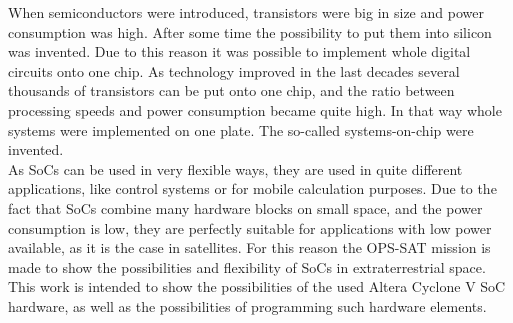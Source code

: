 When semiconductors were introduced, transistors were big in size and power consumption was high. After some time the possibility to put them into silicon was invented. Due to this reason it was possible to implement whole digital circuits onto one chip. As technology improved in the last decades several thousands of transistors can be put onto one chip, and the ratio between processing speeds and power consumption became quite high. In that way whole systems were implemented on one plate. The so-called systems-on-chip were invented.\\
As SoCs can be used in very flexible ways, they are used in quite different applications, like control systems or for mobile calculation purposes. Due to the fact that SoCs combine many hardware blocks on small space, and the power consumption is low, they are perfectly suitable for applications with low power available, as it is the case in satellites. For this reason the OPS-SAT mission is made to show the possibilities and flexibility of SoCs in extraterrestrial space.\\
This work is intended to show the possibilities of the used Altera Cyclone V SoC hardware, as well as the possibilities of programming such hardware elements.